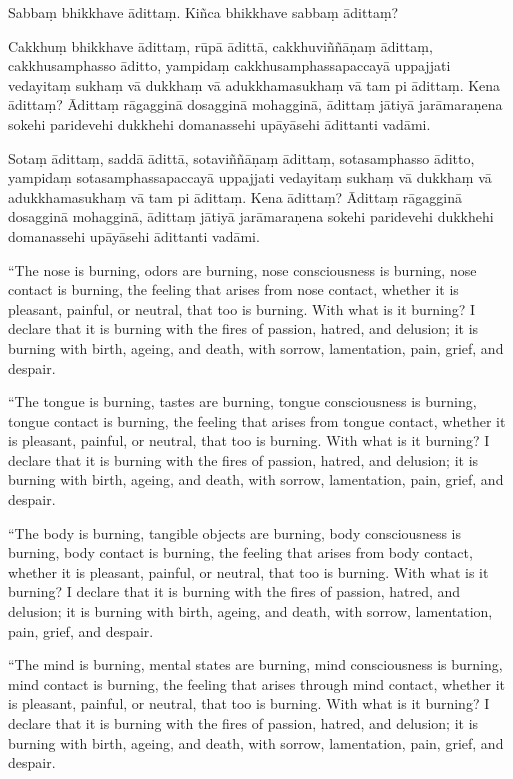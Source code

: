 Sabbaṃ bhikkhave ādittaṃ. Kiñca bhikkhave sabbaṃ ādittaṃ?

Cakkhuṃ bhikkhave ādittaṃ, rūpā ādittā, cakkhuviññāṇaṃ ādittaṃ,
cakkhusamphasso āditto, yampidaṃ cakkhusamphassapaccayā uppajjati
vedayitaṃ sukhaṃ vā dukkhaṃ vā adukkhamasukhaṃ vā tam pi ādittaṃ. Kena
ādittaṃ? Ādittaṃ rāgagginā dosagginā mohagginā, ādittaṃ jātiyā
jarāmaraṇena sokehi paridevehi dukkhehi domanassehi upāyāsehi ādittanti
vadāmi.

Sotaṃ ādittaṃ, saddā ādittā, sotaviññāṇaṃ ādittaṃ, sotasamphasso āditto,
yampidaṃ sotasamphassapaccayā uppajjati vedayitaṃ sukhaṃ vā dukkhaṃ vā
adukkhamasukhaṃ vā tam pi ādittaṃ. Kena ādittaṃ? Ādittaṃ rāgagginā
dosagginā mohagginā, ādittaṃ jātiyā jarāmaraṇena sokehi paridevehi
dukkhehi domanassehi upāyāsehi ādittanti vadāmi.

\clearpage

\englishText

``The nose is burning, odors are burning, nose consciousness is burning,
nose contact is burning, the feeling that arises from nose contact,
whether it is pleasant, painful, or neutral, that too is burning. With
what is it burning? I declare that it is burning with the fires of
passion, hatred, and delusion; it is burning with birth, ageing, and
death, with sorrow, lamentation, pain, grief, and despair.

``The tongue is burning, tastes are burning, tongue consciousness is
burning, tongue contact is burning, the feeling that arises from tongue
contact, whether it is pleasant, painful, or neutral, that too is
burning. With what is it burning? I declare that it is burning with the
fires of passion, hatred, and delusion; it is burning with birth,
ageing, and death, with sorrow, lamentation, pain, grief, and despair.

``The body is burning, tangible objects are burning, body consciousness
is burning, body contact is burning, the feeling that arises from body
contact, whether it is pleasant, painful, or neutral, that too is
burning. With what is it burning? I declare that it is burning with the
fires of passion, hatred, and delusion; it is burning with birth,
ageing, and death, with sorrow, lamentation, pain, grief, and despair.

``The mind is burning, mental states are burning, mind consciousness is
burning, mind contact is burning, the feeling that arises through mind
contact, whether it is pleasant, painful, or neutral, that too is
burning. With what is it burning? I declare that it is burning with the
fires of passion, hatred, and delusion; it is burning with birth,
ageing, and death, with sorrow, lamentation, pain, grief, and despair.

